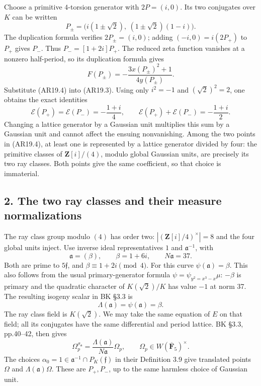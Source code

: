\documentclass[11pt,a4paper]{article}
\begin{document}
Choose a primitive \(4\)-torsion generator with \(2P=(i,0)\). Its two
conjugates over \(K\) can be written \[
P_\pm=\bigl(i(1\pm\sqrt2),\ (1\pm\sqrt2)(1-i)\bigr).
\tag{AR19.4}
\] The duplication formula verifies \(2P_\pm=(i,0)\); adding
\((-i,0)=i(2P_+)\) to \(P_+\) gives \(P_-\). Thus \(P_-=[1+2i]P_+\). The
reduced zeta function vanishes at a nonzero half-period, so its
duplication formula gives \[
F(P_\pm)=-\frac{3x(P_\pm)^2+1}{4y(P_\pm)}.
\] Substitute (AR19.4) into (AR19.3). Using only \(i^2=-1\) and
\((\sqrt2)^2=2\), one obtains the exact identities \[
\mathcal E(P_+)=\mathcal E(P_-)=-\frac{1+i}{4},
\qquad
\mathcal E(P_+)+\mathcal E(P_-)=-\frac{1+i}{2}.
\tag{AR19.5}
\] Changing a lattice generator by a Gaussian unit multiplies this sum
by a Gaussian unit and cannot affect the ensuing nonvanishing. Among the
two points in (AR19.4), at least one is represented by a lattice
generator divided by four: the primitive classes of
\(\mathbf Z[i]/(4)\), modulo global Gaussian units, are precisely its
two ray classes. Both points give the same coefficient, so that choice
is immaterial.

\subsection{2. The two ray classes and their measure
normalizations}\label{the-two-ray-classes-and-their-measure-normalizations}

The ray class group modulo \((4)\) has order two:
\(|(\mathbf Z[i]/4)^\times|=8\) and the four global units inject. Use
inverse ideal representatives \(1\) and \(\mathfrak a^{-1}\), with \[
\mathfrak a=(\beta),\qquad \beta=1+6i,\qquad N\mathfrak a=37.
\] Both are prime to \(5\mathfrak f\), and \(\beta\equiv1+2i\pmod4\).
For this curve \(\psi(\mathfrak a)=\beta\). This also follows from the
usual primary-generator formula \(\psi=\psi_{y^2=x^3-x}\mu\): \(-\beta\)
is primary and the quadratic character of \(K(\sqrt2)/K\) has value
\(-1\) at norm 37. The resulting isogeny scalar in BK §3.3 is \[
\Lambda(\mathfrak a)=\psi(\mathfrak a)=\beta.
\] The ray class field is \(K(\sqrt2)\). We may take the same equation
of \(E\) on that field; all its conjugates have the same differential
and period lattice. BK §3.3, pp.40--42, then gives \[
\Omega_p^{\sigma_{\mathfrak a}}
 =\frac{\Lambda(\mathfrak a)}{N\mathfrak a}\Omega_p,
\qquad \Omega_p\in W(\overline{\mathbf F}_5)^\times.
\tag{AR19.6}
\] The choices \(\alpha_0=1\in\mathfrak a^{-1}\cap P_K(\mathfrak f)\) in
their Definition 3.9 give translated points \(\Omega\) and
\(\Lambda(\mathfrak a)\Omega\). These are \(P_+,P_-\), up to the same
harmless choice of Gaussian unit.
\end{document}
